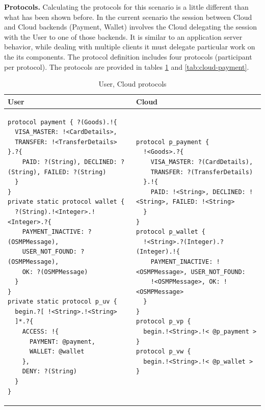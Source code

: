 \textbf{Protocols.} Calculating the protocols for this scenario is a little different than what has been shown before. In the current scenario the session between Cloud and Cloud backends (Payment, Wallet) involves the Cloud delegating the session with the User to one of those backends. It is similar to an application server behavior, while dealing with multiple clients it must delegate particular work on the its components. The protocol definition includes four protocols (participant per protocol). The protocols are provided in tables \ref{tab:user-cloud-protocols} and \ref{tab:cloud-payment}.

{
\lstset{
framerule=0pt,
numbers=none
}
\begin{longtable}{|p{}|p{}|}
\caption{User, Cloud protocols}\label{tab:user-cloud-protocols} \\ \hline
\textbf{User} & \textbf{Cloud} \\ \hline \endhead
\begin{lstlisting}
protocol payment { ?(Goods).!{
  VISA_MASTER: !<CardDetails>,
  TRANSFER: !<TransferDetails> }.?{
    PAID: ?(String), DECLINED: ?(String), FAILED: ?(String)
  } 
}
private static protocol wallet { 
  ?(String).!<Integer>.!<Integer>.?{
    PAYMENT_INACTIVE: ?(OSMPMessage),
    USER_NOT_FOUND: ?(OSMPMessage),
    OK: ?(OSMPMessage) 
  } 
}
private static protocol p_uv {
  begin.?[ !<String>.!<String>
  ]*.?{
    ACCESS: !{
      PAYMENT: @payment,
      WALLET: @wallet 
    },
    DENY: ?(String) 
  }
}
\end{lstlisting}
&
\begin{lstlisting}
protocol p_payment { 
  !<Goods>.?{
    VISA_MASTER: ?(CardDetails),
    TRANSFER: ?(TransferDetails) 
  }.!{
    PAID: !<String>, DECLINED: !<String>, FAILED: !<String>
  } 
}
protocol p_wallet { 
  !<String>.?(Integer).?(Integer).!{
    PAYMENT_INACTIVE: !<OSMPMessage>, USER_NOT_FOUND:
    !<OSMPMessage>, OK: !<OSMPMessage>
  }
}
protocol p_vp {
  begin.!<String>.!< @p_payment > 
}
protocol p_vw {
  begin.!<String>.!< @p_wallet >
}
\end{lstlisting}
\\ \hline
\end{longtable}
}

